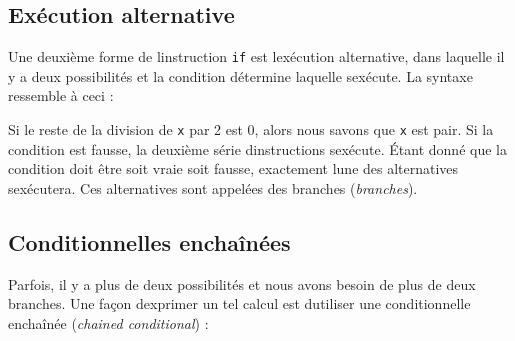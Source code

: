 \begin{Shaded}
\begin{Highlighting}[]
\OperatorTok{\textless{}} \NormalTok{:}
      \CommentTok{\# }
\end{Highlighting}
\end{Shaded}

\hypertarget{exuxe9cution-alternative}{%
\subsection{Exécution alternative}\label{exuxe9cution-alternative}}

Une deuxième forme de l\textquotesingle instruction \texttt{if} est
l\textquotesingle exécution alternative, dans laquelle il y a deux
possibilités et la condition détermine laquelle
s\textquotesingle exécute. La syntaxe ressemble à ceci :

\begin{Shaded}
\begin{Highlighting}[]
\OperatorTok{\%}  \OperatorTok{==} \NormalTok{:}
    \NormalTok{(}\NormalTok{)}
\NormalTok{:}
    \NormalTok{(}\NormalTok{)}
\end{Highlighting}
\end{Shaded}

Si le reste de la division de \texttt{x} par 2 est 0, alors nous savons
que \texttt{x} est pair. Si la condition est fausse, la deuxième série
d\textquotesingle instructions s\textquotesingle exécute. Étant donné
que la condition doit être soit vraie soit fausse, exactement
l\textquotesingle une des alternatives s\textquotesingle exécutera. Ces
alternatives sont appelées des branches (\emph{branches}).

\hypertarget{conditionnelles-enchauxeenuxe9es}{%
\subsection{Conditionnelles
enchaînées}\label{conditionnelles-enchauxeenuxe9es}}

Parfois, il y a plus de deux possibilités et nous avons besoin de plus
de deux branches. Une façon d\textquotesingle exprimer un tel calcul est
d\textquotesingle utiliser une conditionnelle enchaînée (\emph{chained
conditional}) :

